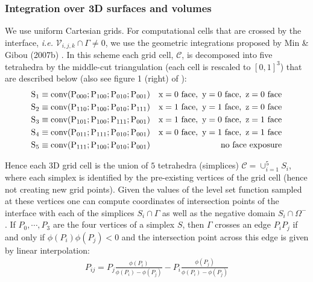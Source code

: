 \documentclass{elsarticle}
\begin{document}
\subsubsection{Integration over 3D surfaces and volumes}
We use uniform Cartesian grids. For computational cells that are crossed by the interface, \textit{i.e.} $\mathcal{V}_{i,j,k}\cap \Gamma \neq 0$, we use the geometric integrations proposed by Min \& Gibou (2007b) \cite{min2007geometric}. In this scheme each grid cell, $\mathcal{C}$, is decomposed into five tetrahedra by the middle-cut triangulation \cite{sallee1984middle} (each cell is rescaled to $[0,1]^3$) that are described below (also see figure 1 (right) of \cite{min2007geometric}):
\begin{align*}
	 & \rm S_1 \equiv conv(P_{000} ; P_{100} ; P_{010} ; P_{001}) & \rm{ x = 0\ face,\ y = 0\ face,\ z = 0\ face} \\
	 & \rm S_2 \equiv conv(P_{110} ; P_{100} ; P_{010} ; P_{111}) & \rm{ x = 1\ face,\ y = 1\ face,\ z = 0\ face} \\
	 & \rm S_3 \equiv conv(P_{101} ; P_{100} ; P_{111} ; P_{001}) & \rm{ x = 1\ face,\ y = 0\ face,\ z = 1\ face} \\
	 & \rm S_4 \equiv conv(P_{011} ; P_{111} ; P_{010} ; P_{001}) & \rm{ x = 0\ face,\ y = 1\ face,\ z = 1\ face} \\
	 & \rm S_5\equiv conv(P_{111} ; P_{100} ; P_{010} ; P_{001})  & \rm{ no\ face\ exposure}
\end{align*}

Hence each 3D grid cell is the union of $5$ tetrahedra (simplices) $\mathcal{C}=\cup_{i=1}^5 S_i$, where each simplex is identified by the pre-existing vertices of the grid cell (hence not creating new grid points). Given the values of the level set function sampled at these vertices one can compute coordinates of intersection points of the interface with each of the simplices $S_i \cap \Gamma $ as well as the negative domain $S_i \cap \Omega^-$. If ${P_0,\cdots, P_3}$ are the four vertices of a simplex $S$, then $\Gamma$ crosses an edge $P_i P_j$ if and only if $\phi(P_i)\phi(P_j)<0$ and the intersection point across this edge is given by linear interpolation:
\begin{align*}
P_{ij}=P_j \frac{\phi(P_i)}{\phi(P_i) - \phi(P_j)} - P_i \frac{\phi(P_j)}{\phi(P_i) - \phi(P_j)}
\end{align*}
\end{document}

